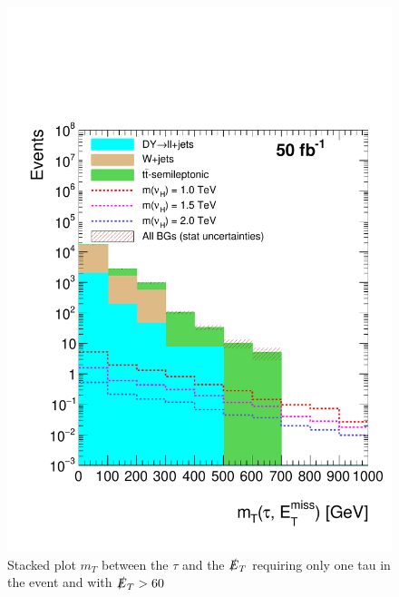 \begin{figure}[htbp!]
\centering
\includegraphics[width=0.9\linewidth]{StackPlots/mT_1Tau_met60_50ifb.pdf}
\caption{Stacked plot $m_{T}$ between the $\tau$ and the $\slashed{E}_{T}$ requiring only one tau in the event and with $\slashed{E}_{T} > 60$}
\label{fig: mT1tauMet60}
\end{figure}










